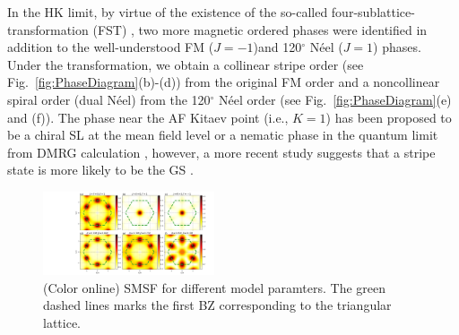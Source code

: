 \documentclass[aps,prb,reprint,amsfonts,amsmath,amssymb,showpacs,groupedaddress,superscriptaddress]{revtex4-1}
\begin{document}
In the HK limit, by virtue of the existence of the so-called four-sublattice-transformation (FST) \cite{PhysRevB.89.014414}, two more magnetic ordered phases were identified in addition to the well-understood FM ($J=-1$)and 120$^\circ$ N\'{e}el ($J=1$) phases. Under the transformation, we obtain a collinear stripe order (see Fig.~\ref{fig:PhaseDiagram}(b)-(d)) from the original FM order and a noncollinear spiral order (dual N\'{e}el) from the 120$^\circ$ N\'{e}el order (see Fig.~\ref{fig:PhaseDiagram}(e) and (f)). The phase near the AF Kitaev point (i.e., $K=1$) has been proposed to be a chiral SL at the mean field level \cite{KaiLi2015} or a nematic phase in the quantum limit from DMRG calculation \cite{PhysRevB.91.155135}, however, a more recent study suggests that a stripe state is more likely to be the GS \cite{PhysRevX.9.021017}.

\begin{figure}
    \includegraphics[width=0.45\textwidth]{Fig3.pdf}
    \caption{\label{fig:StructureFactors}(Color online) SMSF for different model paramters. The green dashed lines marks the first BZ corresponding to the triangular lattice.}
\end{figure}
\end{document}
